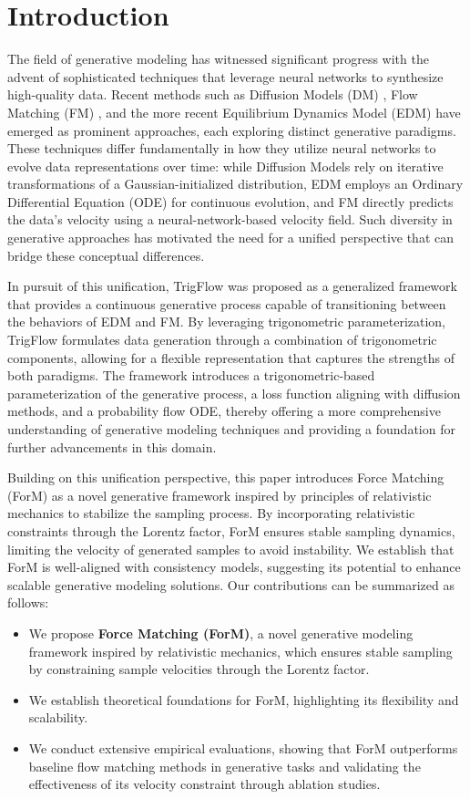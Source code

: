 \section{Introduction}
The field of generative modeling has witnessed significant progress with the advent of sophisticated techniques that leverage neural networks to synthesize high-quality data. Recent methods such as Diffusion Models (DM) \cite{swm+15,hja20,dn21,rbl+22,zlcz23,zlke23}, Flow Matching (FM) \cite{lcb+22,lgl22,ekb+24}, and the more recent Equilibrium Dynamics Model (EDM) \cite{kaal22, kal+24} have emerged as prominent approaches, each exploring distinct generative paradigms. These techniques differ fundamentally in how they utilize neural networks to evolve data representations over time: while Diffusion Models rely on iterative transformations of a Gaussian-initialized distribution, EDM employs an Ordinary Differential Equation (ODE) for continuous evolution, and FM directly predicts the data's velocity using a neural-network-based velocity field. Such diversity in generative approaches has motivated the need for a unified perspective that can bridge these conceptual differences.

In pursuit of this unification, TrigFlow \cite{ls24} was proposed as a generalized framework that provides a continuous generative process capable of transitioning between the behaviors of EDM and FM. By leveraging trigonometric parameterization, TrigFlow formulates data generation through a combination of trigonometric components, allowing for a flexible representation that captures the strengths of both paradigms. The framework introduces a trigonometric-based parameterization of the generative process, a loss function aligning with diffusion methods, and a probability flow ODE, thereby offering a more comprehensive understanding of generative modeling techniques and providing a foundation for further advancements in this domain.

Building on this unification perspective, this paper introduces Force Matching (ForM) as a novel generative framework inspired by principles of relativistic mechanics to stabilize the sampling process. By incorporating relativistic constraints through the Lorentz factor, ForM ensures stable sampling dynamics, limiting the velocity of generated samples to avoid instability. 
We establish that ForM is well-aligned with consistency models, suggesting its potential to enhance scalable generative modeling solutions.
Our contributions can be summarized as follows:
\begin{itemize}
    \item We propose \textbf{Force Matching (ForM)}, a novel generative modeling framework inspired by relativistic mechanics, which ensures stable sampling by constraining sample velocities through the Lorentz factor.
    \item We establish theoretical foundations for ForM, 
    highlighting its flexibility and scalability.
    \item We conduct extensive empirical evaluations, showing that ForM outperforms baseline flow matching methods in generative tasks and validating the effectiveness of its velocity constraint through ablation studies.
\end{itemize}

